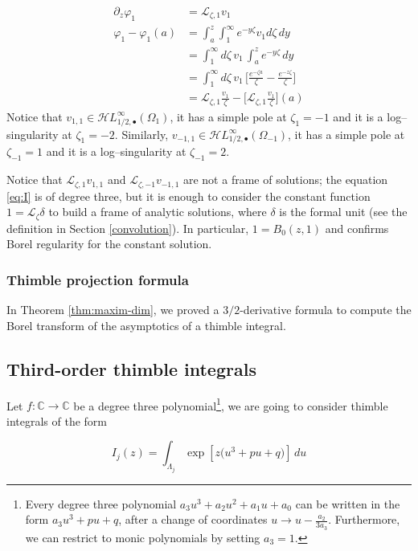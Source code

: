 \documentclass{article}
\newcommand{\singexp}[2]{\mathcal{H}L^\infty_{#1, #2}}
\newcommand{\singexpalg}[1]{\singexp{#1}{\bullet}}
\newcommand{\C}{\mathbb{C}}
\newcommand{\laplace}{\mathcal{L}}
\theoremstyle{definition}
\theoremstyle{plain}
\newenvironment{verify}{\color{ForestGreen}}{\color{black}}
\begin{document}
{\begin{verify}
\begin{align*}
    \partial_z\varphi_1&=\laplace_{\zeta,1}v_1\\
    \varphi_1-\varphi_1(a)&=\int_a^z\int_1^{\infty}e^{-y\zeta} v_1 d\zeta \, dy\\
    &=\int_1^{\infty}d\zeta\,  v_1 \, \int_a^ze^{-y\zeta}  \, dy\\
    &=\int_1^{\infty}d\zeta\,  v_1 \, \Big[\frac{e^{-\zeta a}}{\zeta}-\frac{e^{-z\zeta}}{\zeta}\Big]\\
    &=\laplace_{\zeta,1} \tfrac{v_1}{\zeta}-\Big[\laplace_{\zeta,1}\tfrac{v_1}{\zeta}\Big](a)
\end{align*}
\end{verify}
Notice that $v_{1,1}\in\singexpalg{1/2}(\Omega_1)$, it has a simple pole at $\zeta_1=-1$ and it is a log--singularity at $\zeta_1=-2$. Similarly, $v_{-1,1}\in\singexpalg{1/2}(\Omega_{-1})$, it has a simple pole at $\zeta_{-1}=1$ and it is a log--singularity at $\zeta_{-1}=2$.

Notice that $\laplace_{\zeta,1}v_{1,1}$ and $\laplace_{\zeta,-1}v_{-1,1}$ are not a frame of solutions; the equation \eqref{eq:I} is of degree three, but it is enough to consider the constant function $1=\laplace_\zeta \delta$ to build a frame of analytic solutions, where $\delta$ is the formal unit (see the definition in Section \ref{convolution}). In particular, $1=B_0(z,1)$ and confirms Borel regularity for the constant solution. 
%
\color{RoyalBlue}
\subsubsection{Thimble projection formula}
In Theorem \ref{thm:maxim-dim}, we proved a $3/2$-derivative formula to compute the Borel transform of the asymptotics of a thimble integral.
\color{black}
\subsection{Third-order thimble integrals}
Let $f\colon\C\to \C$ be a degree three polynomial\footnote{Every degree three polynomial $a_3 u^3+a_2 u^2+a_1 u+a_0$ can be written in the form $a_3u^3+pu+q$, after a change of coordinates $u\to u-\frac{a_2}{3 a_3}$. Furthermore, we can restrict to monic polynomials by setting $a_3=1$.}, we are going to consider thimble integrals of the form 

\[ I_j(z) = \int_{\Lambda_j} \exp\left[z\big(u^3 + pu + q)\right]\,du \]

}
\end{document}
